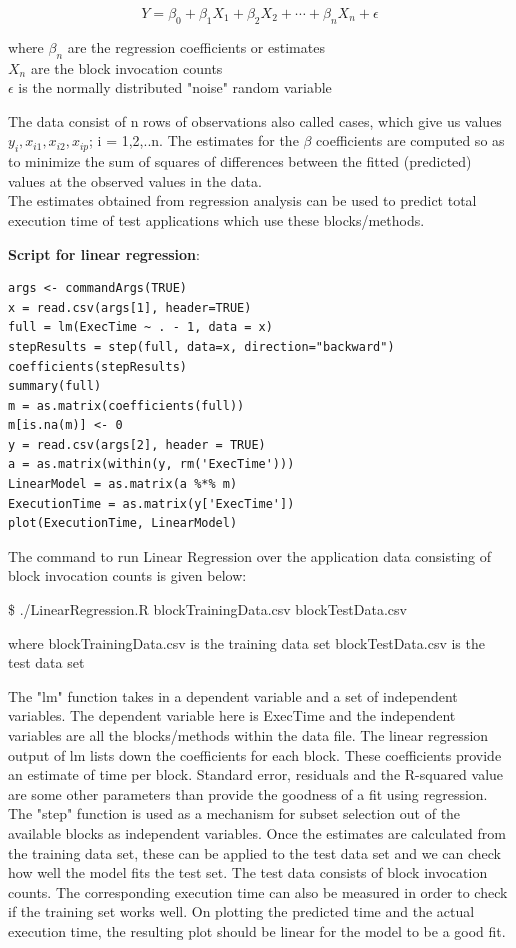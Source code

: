 \documentclass[11pt]{article}
\begin{document}
\begin{equation}
Y = \beta_{0} + \beta_{1}X_{1}+ \beta_{2}X_{2} + \dotsb+ \beta_{n}X_{n} + \epsilon
\end{equation}

where $\beta_{n}$ are the regression coefficients or estimates\\
$X_{n}$ are the block invocation counts\\
$\epsilon$ is the normally distributed "noise" random variable

The data consist of n rows of observations also called cases, which give us values $y_{i},x_{i1},x_{i2},x_{ip}$; i = 1,2,..n.  The estimates for the $\beta$ coefficients are computed so as to minimize the sum of squares of differences between the fitted (predicted) values at the observed values in the data.\\

The estimates obtained from regression analysis can be used to predict total execution time of test applications which use these blocks/methods. 

\textbf{Script for linear regression}:
\begin{lstlisting}
args <- commandArgs(TRUE)
x = read.csv(args[1], header=TRUE)
full = lm(ExecTime ~ . - 1, data = x)
stepResults = step(full, data=x, direction="backward")
coefficients(stepResults)
summary(full)
m = as.matrix(coefficients(full))
m[is.na(m)] <- 0
y = read.csv(args[2], header = TRUE)
a = as.matrix(within(y, rm('ExecTime')))
LinearModel = as.matrix(a %*% m)
ExecutionTime = as.matrix(y['ExecTime'])
plot(ExecutionTime, LinearModel)
\end{lstlisting}

The command to run Linear Regression over the application data consisting of block invocation counts is given below:

\$ ./LinearRegression.R blockTrainingData.csv blockTestData.csv

where blockTrainingData.csv is the training data set
	  blockTestData.csv is the test data set
	  
The "lm" function takes in a dependent variable and a set of independent variables. The dependent variable here is ExecTime and the independent variables are all the blocks/methods within the data file. The linear regression output of lm lists down the coefficients for each block. These coefficients provide an estimate of time per block. Standard error, residuals and the R-squared value are some other parameters than provide the goodness of a fit using regression. The "step" function is used as a mechanism for subset selection out of the available blocks as independent variables.
Once the estimates are calculated from the training data set, these can be applied to the test data set and we can check how well the model fits the test set. The test data consists of block invocation counts. The corresponding execution time can also be measured in order to check if the training set works well. On plotting the predicted time and the actual execution time, the resulting plot should be linear for the model to be a good fit.
\newpage
\end{document}
